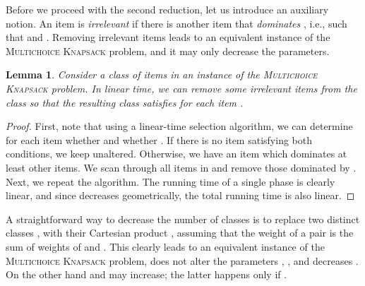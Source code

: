 \documentclass{article}
\theoremstyle{plain}
\newtheorem{lemma}[theorem]{Lemma}
\theoremstyle{definition}
\newcommand{\MK}{\textsc{Multichoice Knapsack}\xspace}
\begin{document}
    
    Before we proceed with the second reduction,   let us introduce an auxiliary notion.
    An item  is \emph{irrelevant} if there is another item  that \emph{dominates} , i.e., 
    such that  and .
    Removing irrelevant items leads to an equivalent instance of the \MK problem, and it may only decrease the parameters.
    
   \begin{lemma}\label{lem:redstep}
   Consider a class of items in an instance of the \MK problem.
   In linear time, we can remove some irrelevant items from the class so that the resulting class 
   satisfies  for each item .
   \end{lemma}
   \begin{proof}
   First, note that using a linear-time selection algorithm, we can determine for each item 
   whether  and whether . 
   If there is no item satisfying both conditions, we keep  unaltered.
   Otherwise, we have an item which dominates at least 
   other items. We scan through all items in  and remove those dominated by .
   Next, we repeat the algorithm.
   The running time of a single phase is clearly linear, and since  decreases geometrically,
   the total running time is also linear.
   \end{proof}    
   
   A straightforward way to decrease the number of classes is to replace two distinct classes , 
   with their Cartesian product , 
   assuming that the weight of a pair  is the sum of weights of  and . 
   This clearly leads to an equivalent instance of the \MK problem, does not alter the parameters , , and decreases . 
   On the other hand  and  may increase; the latter happens only if .
      
\end{document}
